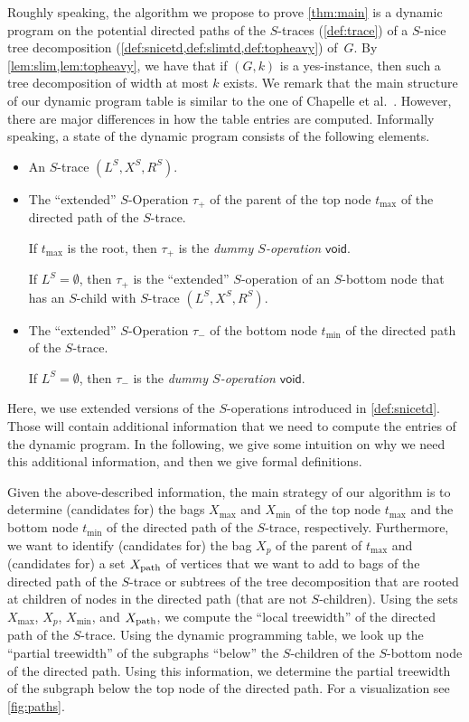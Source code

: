 \documentclass[a4paper,UKenglish,cleveref, autoref, thm-restate, numberwithinsect]{lipics-v2021}
\newcounter{algorithm}
\newcommand{\void}{\mathsf{void}}
\newcommand{\dpath}{\textup{path}}
\newcommand{\slim}{\text{slim}\xspace}
\newcommand{\topheavy}{\text{top-heavy}\xspace}
\begin{document}
Roughly speaking, the algorithm we propose to prove \cref{thm:main} is a dynamic program on the potential directed paths of the $S$-traces (\cref{def:trace}) of a \slim \topheavy $S$-nice tree decomposition (\cref{def:snicetd,def:slimtd,def:topheavy}) of~$G$. By \cref{lem:slim,lem:topheavy}, we have that if $(G,k)$ is a yes-instance, then such a tree decomposition of width at most $k$ exists. We remark that the main structure of our dynamic program table is similar to the one of Chapelle et al.~\cite{chapelle2017treewidth}. However, there are major differences in how the table entries are computed.
Informally speaking, a state of the dynamic program consists of the following elements.
\begin{itemize}
    \item An $S$-trace $(L^S, X^S, R^S)$.
    \item The ``extended'' $S$-Operation $\tau_+$ of the parent of the top node $t_{\max}$ of the directed path of the $S$-trace. 

    If $t_{\max}$ is the root, then $\tau_+$ is the \emph{dummy $S$-operation} $\void$.
    
    If $L^S=\emptyset$, then $\tau_+$ is the ``extended'' $S$-operation of an $S$-bottom node that has an $S$-child with $S$-trace $(L^S, X^S, R^S)$.
    \item The ``extended'' $S$-Operation $\tau_-$ of the bottom node $t_{\min}$ of the directed path of the $S$-trace.

   If $L^S=\emptyset$, then $\tau_-$ is the \emph{dummy $S$-operation} $\void$.
\end{itemize}
Here, we use extended versions of the $S$-operations introduced in \cref{def:snicetd}. Those will contain additional information that we need to compute the entries of the dynamic program. In the following, we give some intuition on why we need this additional information, and then we give formal definitions.


Given the above-described information, the main strategy of our algorithm is to determine (candidates for) the bags $X_{\max}$ and $X_{\min}$ of the top node $t_{\max}$ and the bottom node $t_{\min}$ of the directed path of the $S$-trace, respectively. Furthermore, we want to identify (candidates for) the bag $X_p$ of the parent of $t_{\max}$ and (candidates for) a set $X_{\dpath}$ of vertices that we want to add to bags of the directed path of the $S$-trace or subtrees of the tree decomposition that are rooted at children of nodes in the directed path (that are not $S$-children). Using the sets $X_{\max}$, $X_p$, $X_{\min}$, and $X_{\dpath}$, we compute the ``local treewidth'' of the directed path of the $S$-trace. Using the dynamic programming table, we look up the ``partial treewidth'' of the subgraphs ``below'' the $S$-children of the $S$-bottom node of the directed path. Using this information, we determine the partial treewidth of the subgraph below the top node of the directed path. For a visualization see \cref{fig:paths}.
\end{document}
